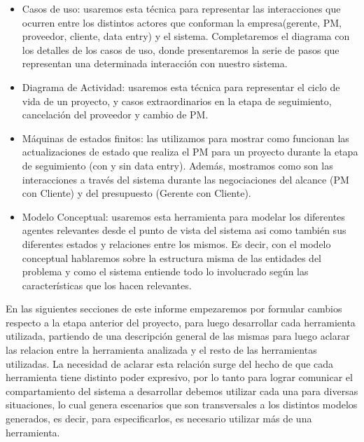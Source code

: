  \begin{itemize}
  \item Casos de uso: usaremos esta técnica para representar las interacciones que ocurren entre los distintos
  actores que conforman la empresa(gerente, PM, proveedor, cliente, data entry) y el sistema. Completaremos
  el diagrama con los detalles de los casos de uso, donde presentaremos la serie de pasos que representan una
  determinada interacción con nuestro sistema.
  \item Diagrama de Actividad: usaremos esta técnica para representar el ciclo de vida de un proyecto, y casos extraordinarios en la etapa de seguimiento, cancelación del proveedor y cambio de PM.
  \item Máquinas de estados finitos: las utilizamos para mostrar como funcionan las actualizaciones de estado que realiza el PM para un proyecto
  durante la etapa de seguimiento (con y sin data entry). Además, mostramos como son las interacciones a través del sistema durante las negociaciones
  del alcance (PM con Cliente) y del presupuesto (Gerente con Cliente).
  \item Modelo Conceptual: usaremos esta herramienta para modelar los diferentes agentes relevantes desde el punto de vista del sistema asi como también sus diferentes estados y relaciones entre los mismos. Es decir, con el modelo conceptual hablaremos sobre la estructura misma de las entidades del problema y como el sistema entiende todo lo involucrado según las características que los hacen relevantes.
 \end{itemize}

En las siguientes secciones de este informe empezaremos por formular cambios respecto a la etapa anterior del proyecto, para luego desarrollar cada herramienta utilizada, partiendo de una descripción general de las mismas para luego aclarar las relacion entre la herramienta analizada y el resto de las herramientas utilizadas. La necesidad de aclarar esta relación surge del hecho de que cada herramienta tiene distinto poder expresivo, por lo tanto
para lograr comunicar el compartamiento del sistema a desarrollar debemos utilizar cada una para diversas situaciones, lo cual genera escenarios que son transversales a los distintos modelos generados, es decir, para especificarlos, es necesario utilizar más de una herramienta.
